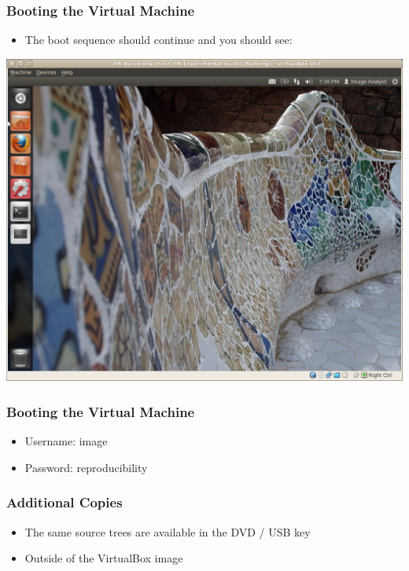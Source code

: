 \begin{frame}
\frametitle{Booting the Virtual Machine}
\begin{itemize}
\item The boot sequence should continue and you should see:
\end{itemize}
\begin{center}
  \includegraphics[width=0.7\paperwidth]{../Art/Screenshot-ITKv4-VirtualBox-01.jpg}
\end{center}
\end{frame}

\begin{frame}
\frametitle{Booting the Virtual Machine}
\begin{itemize}
\item Username: image
\item Password: reproducibility
\end{itemize}
\end{frame}



\begin{frame}
\frametitle{Additional Copies}
\begin{itemize}
\item The same source trees are available in the DVD / USB key
\item Outside of the VirtualBox image
\end{itemize}
\end{frame}

